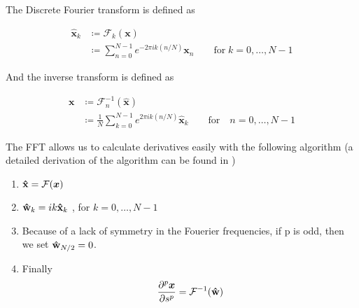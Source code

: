 
The Discrete Fourier transform is defined as

\begin{align*}
  \boldsymbol{\hat{x}}_k& \coloneqq \mathcal{F}_k(\boldsymbol{x})\\
  & \coloneqq \sum_{n=0}^{N-1} e^{-2\pi i k (n/N)} \boldsymbol{x}_n \qquad \text{for} \; k = 0, \dotsc, N-1
\end{align*}

And the inverse transform is defined as

\begin{align*}
  \boldsymbol{x}& \coloneqq \mathcal{F}_n^{-1}(\boldsymbol{\hat{x}})\\
  & \coloneqq \frac{1}{N} \sum_{k=0}^{N-1} e^{2\pi i k (n/N)} \boldsymbol{\hat{x}}_k \qquad \text{for} \quad n = 0, \dotsc, N-1
\end{align*}

The FFT allows us to calculate derivatives easily with the following algorithm (a detailed derivation of the algorithm can be found in \cite{trefethen_2000})

\begin{enumerate}
  \item $\mathbf{\hat{x}} = \mathcal{F}(\boldsymbol{x})$
  \item $\mathbf{\hat{w}}_k = ik \mathbf{\hat{x}}_k$ , for $k = 0, \dotsc, N-1$
  \item Because of a lack of symmetry in the Fouerier frequencies, if p is odd, then we set $\mathbf{\hat{w}}_{N/2} = 0$.
  \item Finally
    \[
      \frac{\partial^p \boldsymbol{x}}{\partial s^p} = \mathcal{F}^{-1}(\mathbf{\hat{w}})
    \]
\end{enumerate}